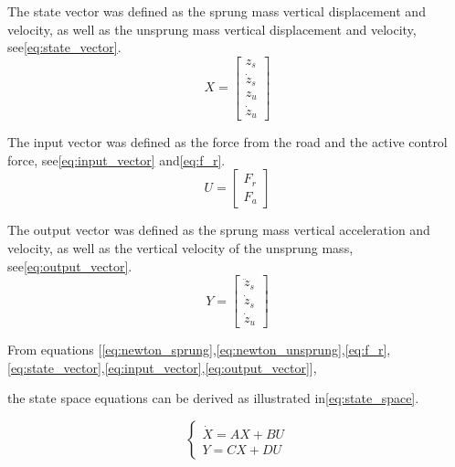 The state vector was defined as the sprung mass vertical displacement and velocity, as well as the unsprung mass vertical displacement and velocity, see\:\eqref{eq:state_vector}.
\begin{equation}
\label{eq:state_vector}
X = 
\begin{bmatrix}
z_s \\
\dot{z}_s \\
z_u \\
\dot{z}_u
\end{bmatrix}
\end{equation}

The input vector was defined as the force from the road and the active control force, see\:\eqref{eq:input_vector} and\:\eqref{eq:f_r}.
\begin{equation}
\label{eq:input_vector}
U = 
\begin{bmatrix}
F_r \\
F_a
\end{bmatrix}
\end{equation}

The output vector was defined as the sprung mass vertical acceleration and velocity, as well as the vertical velocity of the unsprung mass, see\:\eqref{eq:output_vector}.
\begin{equation}
\label{eq:output_vector}
Y = 
\begin{bmatrix}
\ddot{z}_s \\
\dot{z}_s \\
\dot{z}_u
\end{bmatrix}
\end{equation}

From equations [\eqref{eq:newton_sprung},\:\eqref{eq:newton_unsprung},\:\eqref{eq:f_r},\:\eqref{eq:state_vector},\:\eqref{eq:input_vector},\:\eqref{eq:output_vector}],

the state space equations can be derived as illustrated in\:\eqref{eq:state_space}.

\begin{dmath}
\label{eq:state_space}
\left\{
\begin{array}{ll}
    \dot{X} = AX + BU \\
    Y = CX + DU
\end{array}
\right.
\end{dmath}


